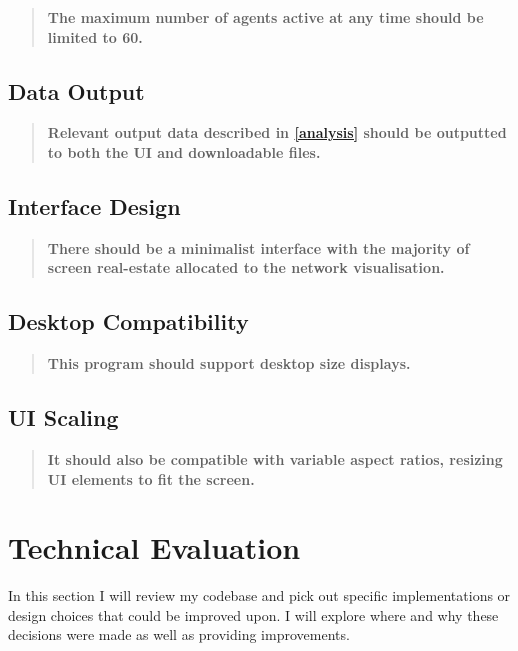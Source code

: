         \begin{quote}
            \textbf{The maximum number of agents active at any time should be limited to 60.}
        \end{quote}

    \subsection{Data Output}

        \begin{quote}
            \textbf{Relevant output data described in \autoref{analysis} should be outputted to both the UI and downloadable files.}
        \end{quote}

    \subsection{Interface Design}

        \begin{quote}
            \textbf{There should be a minimalist interface with the majority of screen real-estate allocated to the network visualisation.}
        \end{quote}

    \subsection{Desktop Compatibility}

        \begin{quote}
            \textbf{This program should support desktop size displays.}
        \end{quote}

    \subsection{UI Scaling}

        \begin{quote}
            \textbf{It should also be compatible with variable aspect ratios, resizing UI elements to fit the screen.}
        \end{quote}

\section{Technical Evaluation}

    In this section I will review my codebase and pick out specific implementations or design choices that could be improved upon. I will explore where and why these decisions were made as well as providing improvements.

